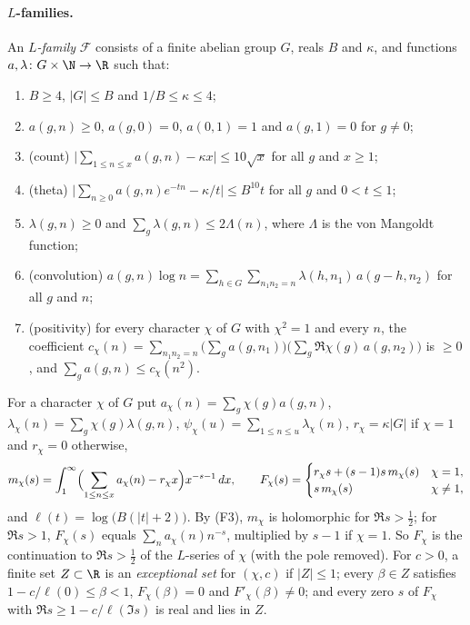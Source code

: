 \paragraph{$L$-families.}
\begin{definition}[$L$-families]\label{pf:sh-misc:lfam}
An \emph{$L$-family} $\mathcal F$ consists of a finite abelian group $G$, reals $B$ and $\kappa$, and functions $a,\lambda\colon G\times\N\to\R$
such that:
\begin{enumerate}[label=(F\arabic*)]
\item $B\ge4$, $|G|\le B$ and $1/B\le\kappa\le4$;
\item $a(g,n)\ge0$, $a(g,0)=0$, $a(0,1)=1$ and $a(g,1)=0$ for $g\ne0$;
\item (count) $\bigl|\sum_{1\le n\le x}a(g,n)-\kappa x\bigr|\le10\sqrt x$ for all $g$ and $x\ge1$;
\item (theta) $\bigl|\sum_{n\ge0}a(g,n)e^{-tn}-\kappa/t\bigr|\le B^{10}t$ for all $g$ and $0<t\le1$;
\item $\lambda(g,n)\ge0$ and $\sum_g\lambda(g,n)\le2\Lambda(n)$, where $\Lambda$ is the von Mangoldt function;
\item (convolution) $a(g,n)\log n=\sum_{h\in G}\sum_{n_1n_2=n}\lambda(h,n_1)\,a(g-h,n_2)$ for all $g$ and $n$;
\item (positivity) for every character $\chi$ of $G$ with $\chi^2=1$ and every $n$, the coefficient
$c_\chi(n)=\sum_{n_1n_2=n}\bigl(\sum_ga(g,n_1)\bigr)\bigl(\sum_g\Re\chi(g)\,a(g,n_2)\bigr)$ is $\ge0$, and $\sum_ga(g,n)\le c_\chi(n^2)$.
\end{enumerate}
\end{definition}

For a character $\chi$ of $G$ put $a_\chi(n)=\sum_g\chi(g)a(g,n)$, $\lambda_\chi(n)=\sum_g\chi(g)\lambda(g,n)$, $\psi_\chi(u)=\sum_{1\le n\le
u}\lambda_\chi(n)$, $r_\chi=\kappa|G|$ if $\chi=1$ and $r_\chi=0$ otherwise,
\[
m_\chi(s)=\int_1^\infty\Bigl(\sum_{1\le n\le x}a_\chi(n)-r_\chi x\Bigr)x^{-s-1}\,dx,\qquad
F_\chi(s)=\begin{cases}r_\chi s+(s-1)s\,m_\chi(s)&\chi=1,\\ s\,m_\chi(s)&\chi\ne1,\end{cases}
\]
and $\ell(t)=\log\bigl(B(|t|+2)\bigr)$. By (F3), $m_\chi$ is holomorphic for $\Re s>\frac12$; for $\Re s>1$, $F_\chi(s)$ equals
$\sum_na_\chi(n)n^{-s}$, multiplied by $s-1$ if $\chi=1$. So $F_\chi$ is the continuation to $\Re s>\frac12$ of the $L$-series of $\chi$ (with the
pole removed). For $c>0$, a finite set $Z\subset\R$ is an \emph{exceptional set} for $(\chi,c)$ if $|Z|\le1$; every $\beta\in Z$ satisfies
$1-c/\ell(0)\le\beta<1$, $F_\chi(\beta)=0$ and $F'_\chi(\beta)\ne0$; and every zero $s$ of $F_\chi$ with $\Re s\ge1-c/\ell(\Im s)$ is real and lies in
$Z$.


